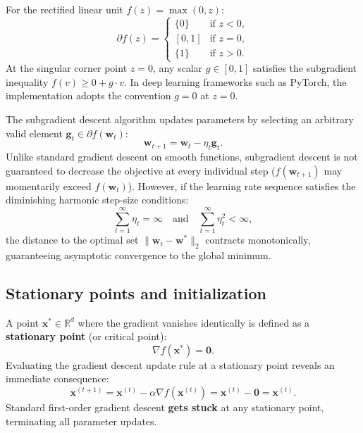 For the rectified linear unit $f(z) = \max(0, z)$:
\begin{equation}
\partial f(z) = \begin{cases}
\{0\} & \text{if } z < 0, \\
[0, 1] & \text{if } z = 0, \\
\{1\} & \text{if } z > 0.
\end{cases}
\label{eq:relu_subdiff}
\end{equation}
At the singular corner point $z = 0$, any scalar $g \in [0, 1]$ satisfies the subgradient inequality $f(v) \ge 0 + g \cdot v$. In deep learning frameworks such as PyTorch, the implementation adopts the convention $g = 0$ at $z = 0$.

The subgradient descent algorithm updates parameters by selecting an arbitrary valid element $\mathbf{g}_t \in \partial f(\mathbf{w}_t)$:
\begin{equation}
\mathbf{w}_{t+1} = \mathbf{w}_t - \eta_t \mathbf{g}_t.
\label{eq:subgradient_update}
\end{equation}
Unlike standard gradient descent on smooth functions, subgradient descent is not guaranteed to decrease the objective at every individual step ($f(\mathbf{w}_{t+1})$ may momentarily exceed $f(\mathbf{w}_t)$). However, if the learning rate sequence satisfies the diminishing harmonic step-size conditions:
\begin{equation}
\sum_{t=1}^\infty \eta_t = \infty \quad \text{and} \quad \sum_{t=1}^\infty \eta_t^2 < \infty,
\label{eq:harmonic_step_sizes}
\end{equation}
the distance to the optimal set $\|\mathbf{w}_t - \mathbf{w}^*\|_2$ contracts monotonically, guaranteeing asymptotic convergence to the global minimum.

\subsection{Stationary points and initialization}
\label{sec:stationary_points_initialization}

A point $\mathbf{x}^* \in \mathbb{R}^d$ where the gradient vanishes identically is defined as a \textbf{stationary point} (or critical point):
\begin{equation}
\nabla f(\mathbf{x}^*) = \mathbf{0}.
\label{eq:stationary_point_def}
\end{equation}
Evaluating the gradient descent update rule at a stationary point reveals an immediate consequence:
\begin{equation}
\mathbf{x}^{(t+1)} = \mathbf{x}^{(t)} - \alpha \nabla f(\mathbf{x}^{(t)}) = \mathbf{x}^{(t)} - \mathbf{0} = \mathbf{x}^{(t)}.
\end{equation}
Standard first-order gradient descent \textbf{gets stuck} at any stationary point, terminating all parameter updates.

